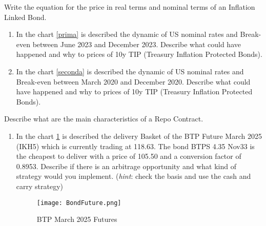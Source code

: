 \documentclass[12pt,a4paper]{exam}
\begin{document}
\begin{questions}


\question 	Write the equation for the price in real terms and nominal terms of an Inflation Linked Bond.
\begin{enumerate}
\item In the chart \ref{prima} is described the dynamic of US nominal rates and Break-even between June 2023 and December 2023. Describe what could have happened and why to prices of 10y TIP (Treasury Inflation Protected Bonds).


\item In the chart \ref{seconda} is described the dynamic of US nominal rates and Break-even between March 2020 and December 2020. Describe what could have happened and why to prices of 10y TIP (Treasury Inflation Protected Bonds).

\end{enumerate}
\makeemptybox{5cm}

\newpage




\newpage



\question Describe what are the main characteristics of a Repo Contract. 
\begin{enumerate}
\item In the chart \ref{terza} is described the delivery Basket of the BTP Future March 2025 (IKH5) which is currently trading at 118.63. The bond BTPS 4.35 Nov33 is the cheapest to deliver with a price of 105.50 and a conversion factor of 0.8953. Describe if there is an arbitrage opportunity and what kind of strategy would you implement. (\textit{hint}: check the basis and use the cash and carry strategy) 

\begin{figure}[h]
    \centering
    \texttt{[image: BondFuture.png]}
    \caption{BTP March 2025 Futures}
    \label{terza}
\end{figure}


\end{enumerate}
\end{questions}
\end{document}
